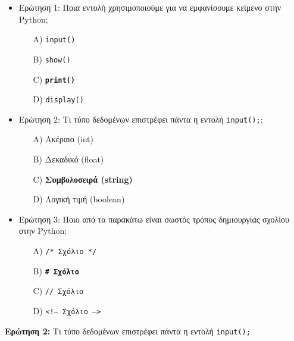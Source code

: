 \documentclass[11pt]{report}
\begin{document}
\begin{itemize}
    \item Ερώτηση 1: Ποια εντολή χρησιμοποιούμε για να εμφανίσουμε κείμενο στην Python;
    \begin{itemize}
        \item[A)] \texttt{input()}
        \item[B)] \texttt{show()}
        \item[C)] \textbf{\texttt{print()}}
        \item[D)] \texttt{display()}
    \end{itemize}

    \item Ερώτηση 2: Τι τύπο δεδομένων επιστρέφει πάντα η εντολή \texttt{input();};
    \begin{itemize}
        \item[A)] Ακέραιο (int)
        \item[B)] Δεκαδικό (float)
        \item[C)] \textbf{Συμβολοσειρά (string)}
        \item[D)] Λογική τιμή (boolean)
    \end{itemize}

    \item Ερώτηση 3: Ποιο από τα παρακάτω είναι σωστός τρόπος δημιουργίας σχολίου στην Python;
    \begin{itemize}
        \item[A)] \texttt{/* Σχόλιο */}
        \item[B)] \textbf{\texttt{\# Σχόλιο}}
        \item[C)] \texttt{// Σχόλιο}
        \item[D)] \texttt{<!-- Σχόλιο -->}
    \end{itemize}
\end{itemize}

\vspace{1em}
\textbf{Ερώτηση 2:} Τι τύπο δεδομένων επιστρέφει πάντα η εντολή \texttt{input();}
\end{document}
